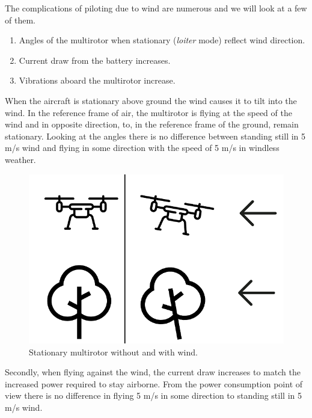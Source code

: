 \documentclass[12pt,oneside]{reedthesis}
\theoremstyle{definition}
\theoremstyle{definition}
\theoremstyle{definition}
\theoremstyle{remark}
\begin{document}
The complications of piloting due to wind are numerous and we will look
at a few of them.
\begin{enumerate}
\def\labelenumi{\arabic{enumi}.}
\item
  Angles of the multirotor when stationary (\emph{loiter} mode) reflect
  wind direction.
\item
  Current draw from the battery increases.
\item
  Vibrations aboard the multirotor increase.
\end{enumerate}
When the aircraft is stationary above ground the wind causes it to tilt
into the wind. In the reference frame of air, the multirotor is flying
at the speed of the wind and in opposite direction, to, in the reference
frame of the ground, remain stationary. Looking at the angles there is
no difference between standing still in 5 m/s wind and flying in some
direction with the speed of 5 m/s in windless weather.
\begin{figure}
\centering
\includegraphics{./figure/wind.PNG}
\caption[\label{fig:wind}Stationary multirotor without and with
wind.]{\label{fig:wind}Stationary multirotor without and with
wind.\footnotemark{}}
\end{figure}

Secondly, when flying against the wind, the current draw increases to
match the increased power required to stay airborne. From the power
consumption point of view there is no difference in flying 5 m/s in some
direction to standing still in 5 m/s wind.
\end{document}
